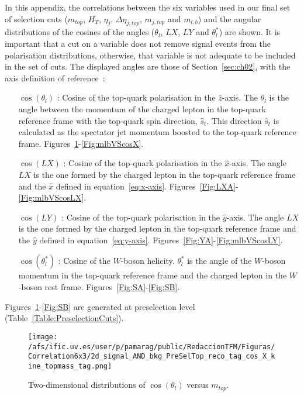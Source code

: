 In this appendix, the correlations between the six variables used in our final set of selection cuts ($m_{top}$, $H_T$, $\eta_j$, $\Delta\eta_{j,top}$, $m_{j,top}$ and $m_{l,b}$) and the angular distributions of  the cosines of the angles ($\theta_l$, $LX$, $LY$ and $\theta_l^{*}$) are shown.
It is important that a cut on a variable does not remove signal events from the polarisation distributions, otherwise, that variable is not adequate to be included in the set of cuts. 
The displayed angles are those of Section~\ref{sec:ch02}, with the axis definition of reference~\cite{Aguilar-Saavedra:2014eqa}:
\begin{itemize}
\item[$\cos(\theta_l)$]: Cosine of the top-quark polarisation in the $\hat{z}$-axis. The  $\theta_l$ is the angle between the momentum of the charged lepton in the top-quark reference frame with the top-quark spin direction, $\hat{s}_t$. This direction $\hat{s}_t$ is calculated as the spectator jet momentum boosted to the top-quark reference frame. Figures~\ref{Fig:XA}-\ref{Fig:mlbVScosX}.
\item[$\cos(LX)$]: Cosine of the top-quark polarisation in the $\hat{x}$-axis. The angle $LX$ is the one formed by the charged lepton in the top-quark reference frame and the $\hat{x}$ defined in equation~\ref{eq:x-axis}. Figures~\ref{Fig:LXA}-\ref{Fig:mlbVScosLX}.
\item[$\cos(LY)$]: Cosine of the top-quark polarisation in the $\hat{y}$-axis. The angle $LX$ is the one formed by the charged lepton in the top-quark reference frame and the $\hat{y}$ defined in equation~\ref{eq:y-axis}. Figures~\ref{Fig:YA}-\ref{Fig:mlbVScosLY}.
\item[$\cos(\theta_l^{*})$]: Cosine of the $W$-boson helicity. $\theta_l^{*}$ is the angle of the $W$-boson momentum in the top-quark reference frame and the charged lepton in the $W$-boson rest frame. Figures~\ref{Fig:SA}-\ref{Fig:SB}.
\end{itemize}
Figures~\ref{Fig:XA}-\ref{Fig:SB} are generated at preselection level (Table~\ref{Table:PreselectionCuts}).

\begin{figure}[h]
\centering
\texttt{[image: /afs/ific.uv.es/user/p/pamarag/public/RedaccionTFM/Figuras/Correlation6x3/2d\_signal\_AND\_bkg\_PreSelTop\_reco\_tag\_cos\_X\_kine\_topmass\_tag.png]}
\caption{Two-dimensional distributions of $\cos(\theta_l)$ versus $m_{top}$.}
\label{Fig:XA}
\end{figure}

